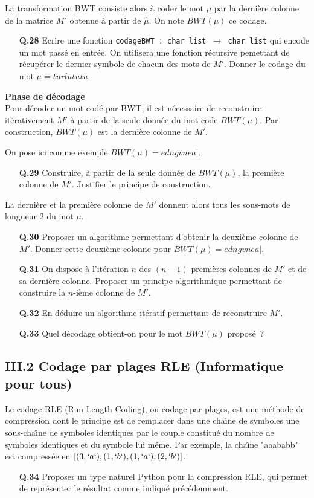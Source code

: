 \documentclass[11pt,a4paper]{article}\nofiles
\begin{document}
La transformation BWT consiste alors \`a coder le mot $\mu$ par la derni\`ere colonne de la matrice $M'$ obtenue \`a partir de $\hat{\mu}$. On note $BWT(\mu)$ ce codage.
\begin{enumerate} 
\item[{\bf Q.28}] Ecrire une fonction \texttt{codageBWT : char list $\to$ char list} qui encode un mot pass\'e en entr\'ee. On utilisera une fonction r\'ecursive pemettant de r\'ecup\'erer le dernier symbole de chacun des mots de $M'$. Donner le codage du mot $\mu=turlututu$.
\end{enumerate}

\textbf{Phase de d\'ecodage}\\
Pour d\'ecoder un mot cod\'e par BWT, il est n\'ecessaire de reconstruire it\'erativement $M'$ \`a partir de la seule donn\'ee du mot code $BWT(\mu)$. 
Par construction, $BWT(\mu)$ est la derni\`ere colonne de $M'$.

On pose ici comme exemple $BWT(\mu)=edngvnea|$.
\begin{enumerate}
\item[{\bf Q.29}] Construire, \`a partir de la seule donn\'ee de $BWT(\mu)$, la premi\`ere colonne de $M'$. Justifier le principe de construction.
\end{enumerate}
La derni\`ere et la premi\`ere colonne de $M'$ donnent alors tous les sous-mots de longueur $2$ du mot $\mu$.
\begin{enumerate}
\item[{\bf Q.30}] Proposer un algorithme permettant d'obtenir la deuxi\`eme colonne de $M'$. Donner cette deuxi\`eme colonne pour $BWT(\mu)=edngvnea|$.
\item[{\bf Q.31}] On dispose \`a l'it\'eration $n$ des $(n-1)$ premi\`eres colonnes de $M'$ et de sa derni\`ere colonne. Proposer un principe algorithmique permettant de construire la $n$-i\`eme colonne de $M'$.
\item[{\bf Q.32}] En d\'eduire un algorithme it\'eratif permettant de reconstruire $M'$.
\item[{\bf Q.33}] Quel d\'ecodage obtient-on pour le mot $BWT(\mu)$ propos\'e~?
\end{enumerate}

\subsection*{III.2 Codage par plages RLE (Informatique pour tous)}
Le codage RLE (Run Length Coding), ou codage par plages, est une m\'ethode de compression dont le principe est de remplacer dans une cha\^\i ne de symboles une sous-cha\^\i ne de symboles identiques par le couple constitu\'e du nombre de symboles identiques et du symbole lui m\^eme. 
Par exemple, la cha\^\i ne "aaababb" est compress\'ee en $[(3,`a`),(1,`b`),(1,`a`),(2,`b`)]$.
\begin{enumerate}
\item[{\bf Q.34}] Proposer un type naturel Python pour la compression RLE, qui permet de repr\'esenter le r\'esultat comme indiqu\'e pr\'ec\'edemment.
\end{enumerate}
\end{document}
